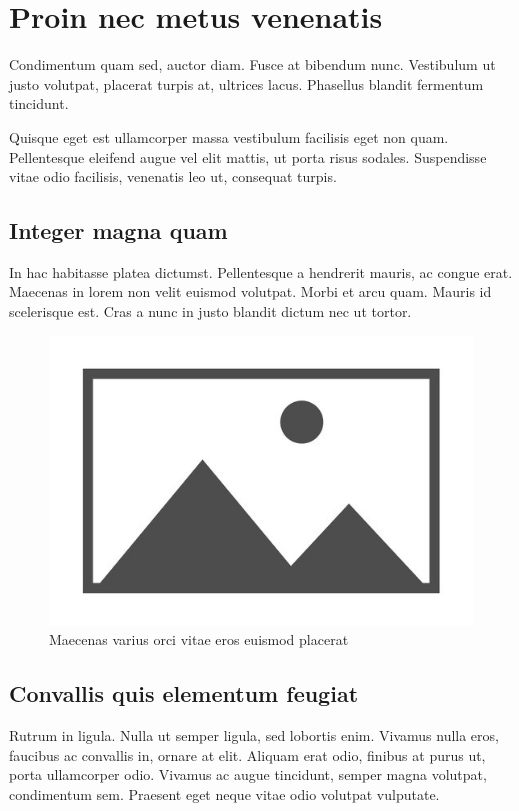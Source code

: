 \section{Proin nec metus venenatis} \label{sec:proin}

Condimentum quam sed, auctor diam. Fusce at bibendum nunc. Vestibulum ut justo
volutpat, placerat turpis at, ultrices lacus. Phasellus blandit fermentum tincidunt.

Quisque eget est ullamcorper massa vestibulum facilisis eget non quam. Pellentesque
eleifend augue vel elit mattis, ut porta risus sodales. Suspendisse vitae odio
facilisis, venenatis leo ut, consequat turpis.

\subsection{Integer magna quam}

In hac habitasse platea dictumst. Pellentesque a hendrerit mauris, ac congue
erat. Maecenas in lorem non velit euismod volutpat. Morbi et arcu quam. Mauris
id scelerisque est. Cras a nunc in justo blandit dictum nec ut tortor.

\begin{figure}[hb]
\centering\includegraphics[scale=1]{demo/book/images/placeholder.jpg}
\caption{Maecenas varius orci vitae eros euismod placerat} \label{fig:integer}
\end{figure}

\subsection{Convallis quis elementum feugiat}

Rutrum in ligula. Nulla ut semper ligula, sed lobortis enim. Vivamus nulla eros,
faucibus ac convallis in, ornare at elit. Aliquam erat odio, finibus at purus ut,
porta ullamcorper odio. Vivamus ac augue tincidunt, semper magna volutpat,
condimentum sem. Praesent eget neque vitae odio volutpat vulputate.
